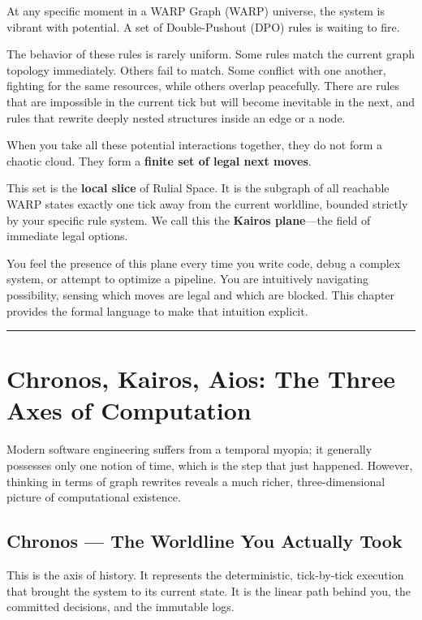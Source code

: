 At any specific moment in a WARP Graph (WARP) universe, the system is vibrant with potential. A set of Double-Pushout (DPO) rules is waiting to fire.

The behavior of these rules is rarely uniform. Some rules match the current graph topology immediately. Others fail to match. Some conflict with one another, fighting for the same resources, while others overlap peacefully. There are rules that are impossible in the current tick but will become inevitable in the next, and rules that rewrite deeply nested structures inside an edge or a node.

When you take all these potential interactions together, they do not form a chaotic cloud. They form a \textbf{finite set of legal next moves}.

This set is the \textbf{local slice} of Rulial Space. It is the subgraph of all reachable WARP states exactly one tick away from the current worldline, bounded strictly by your specific rule system. We call this the \textbf{Kairos plane}—the field of immediate legal options.

You feel the presence of this plane every time you write code, debug a complex system, or attempt to optimize a pipeline. You are intuitively navigating possibility, sensing which moves are legal and which are blocked. This chapter provides the formal language to make that intuition explicit.

\begin{center}
\rule{0.5\linewidth}{0.5pt}
\end{center}

\section{Chronos, Kairos, Aios: The Three Axes of Computation}
\label{chronos-kairos-aios-the-three-axes-of-computation}

Modern software engineering suffers from a temporal myopia; it generally possesses only one notion of time, which is the step that just happened. However, thinking in terms of graph rewrites reveals a much richer, three-dimensional picture of computational existence.

\subsection{Chronos — The Worldline You Actually Took}
This is the axis of history. It represents the deterministic, tick-by-tick execution that brought the system to its current state. It is the linear path behind you, the committed decisions, and the immutable logs.


